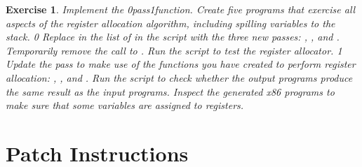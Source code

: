 \documentclass[7x10]{TimesAPriori_MIT}%
\def\racketEd{0}
\def\pythonEd{1}
\providecommand{\BookEdition}{1}
\let\edition\BookEdition
\newcommand{\racket}[1]{{\if\edition\racketEd{#1}\fi}}
\newcommand{\pythonColor}[0]{}
\newcommand{\python}[1]{{\if\edition\pythonEd\pythonColor #1\fi}}
\newtheorem{exercise}[theorem]{Exercise}
\numberwithin{theorem}{chapter}
\numberwithin{definition}{chapter}
\numberwithin{equation}{chapter}
\begin{document}
\begin{exercise}\normalfont\normalsize
Implement the  \racket{pass}\python{function}.
Create five programs that exercise all aspects of the register
allocation algorithm, including spilling variables to the stack.
%
{\if\edition\racketEd      
Replace  in the list of  in the
 script with the three new passes:
, , and
.
Temporarily remove the call to .
Run the script to test the register allocator.
\fi}
%
{\if\edition\pythonEd\pythonColor      
  Update the  pass to make use of
  the functions you have created to perform register allocation:
  , , and
  .
  Run the  script to check whether the
  output programs produce the same result as the input programs.
  Inspect the generated x86 programs to make sure that some variables
  are assigned to registers.
\fi}
\end{exercise}


\section{Patch Instructions}
\label{sec:patch-instructions}
\end{document}
